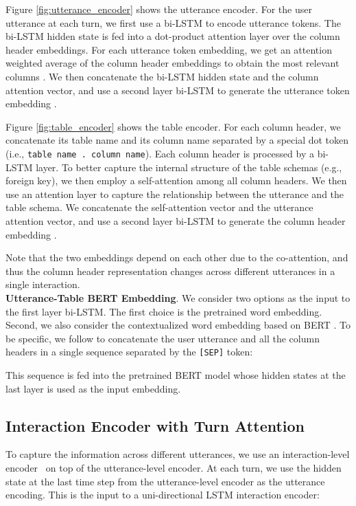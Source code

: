 \documentclass[11pt,a4paper]{article}
\begin{document}
Figure \ref{fig:utterance_encoder} shows the utterance encoder.
For the user utterance at each turn, we first use a bi-LSTM to encode utterance tokens.
The bi-LSTM hidden state is fed into a dot-product attention layer \cite{luong2015effective} over the column header embeddings.
For each utterance token embedding, we get an attention weighted average of the column header embeddings to obtain the most relevant columns \cite{dong2018coarse}.
We then concatenate the bi-LSTM hidden state and the column attention vector, and use a second layer bi-LSTM to generate the utterance token embedding .

Figure \ref{fig:table_encoder} shows the table encoder.
For each column header, we concatenate its table name and its column name separated by a special dot token (i.e., \texttt{table name . column name}).
Each column header is processed by a bi-LSTM layer.
To better capture the internal structure of the table schemas (e.g., foreign key), we then employ a self-attention \cite{vaswani2017attention} among all column headers.
We then use an attention layer to capture the relationship between the utterance and the table schema.
We concatenate the self-attention vector and the utterance attention vector, and use a second layer bi-LSTM to generate the column header embedding .

Note that the two embeddings depend on each other due to the co-attention, and thus the column header representation changes across different utterances in a single interaction.
\\\noindent
\textbf{Utterance-Table BERT Embedding}. We consider two options as the input to the first layer bi-LSTM.
The first choice is the pretrained word embedding.
Second, we also consider the contextualized word embedding based on BERT \cite{devlin2019bert}.
To be specific, we follow  to concatenate the user utterance and all the column headers in a single sequence separated by the \texttt{[SEP]} token:

This sequence is fed into the pretrained BERT model whose hidden states at the last layer is used as the input embedding.

\subsection{Interaction Encoder with Turn Attention}
\label{sec:turn-attention}
To capture the information across different utterances, we use an interaction-level encoder~\cite{suhr2018learning} on top of
the utterance-level encoder.
At each turn, we use the hidden state at the last time step from the utterance-level encoder as the utterance encoding.
This is the input to a uni-directional LSTM interaction encoder:
\end{document}
